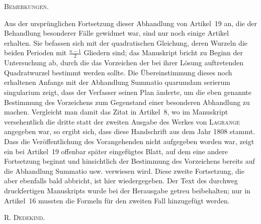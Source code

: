 \clearpage
\par\bigskip
{}
\begin{center}\textsc{Bemerkungen.}\end{center}
\begingroup\small
Aus der ursprünglichen Fortsetzung dieser Abhandlung von Artikel~19 an, die der Behandlung besonderer Fälle gewidmet war, sind nur noch einige Artikel erhalten. Sie befassen sich mit der quadratischen Gleichung, deren Wurzeln die beiden Perioden mit $\frac{n-1}2$ Gliedern sind; das Manuskript bricht zu Beginn der Untersuchung ab, durch die das Vorzeichen der bei ihrer Lösung auftretenden Quadratwurzel bestimmt werden sollte. Die Übereinstimmung dieses noch erhaltenen Anfangs mit der Abhandlung Summatio quarumdam serierum singularium zeigt, dass der Verfasser seinen Plan änderte, um die eben genannte Bestimmung des Vorzeichens zum Gegenstand einer besonderen Abhandlung zu machen. Vergleicht man damit das Zitat in Artikel~8, wo im Manuskript versehentlich die dritte statt der zweiten Ausgabe des Werkes von \textsc{Lagrange} angegeben war, so ergibt sich, dass diese Handschrift aus dem Jahr 1808 stammt. Dass die Veröffentlichung des Vorangehenden nicht aufgegeben worden war, zeigt ein bei Artikel~19 offenbar später eingefügtes Blatt, auf dem eine andere Fortsetzung beginnt und hinsichtlich der Bestimmung des Vorzeichens bereits auf die Abhandlung Summatio usw. verwiesen wird. Diese zweite Fortsetzung, die aber ebenfalls bald abbricht, ist hier wiedergegeben. Der Text des durchweg druckfertigen Manuskripts wurde bei der Herausgabe getreu beibehalten; nur in Artikel~16 mussten die Formeln für den zweiten Fall hinzugefügt werden.
\begin{flushright}R. \textsc{Dedekind}.\end{flushright}
\endgroup
{}
